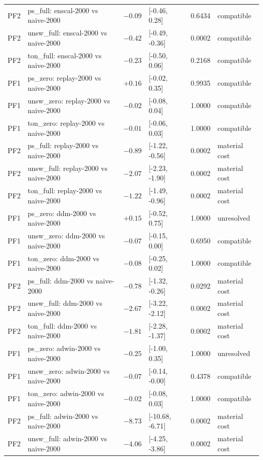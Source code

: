 \begin{table}[t]
\begin{tabular}{l l r l r l}
PF2 & ps\_full: enscal-2000 vs naive-2000 & $-0.09$ & [-0.46, 0.28] & 0.6434 & compatible \\
PF2 & unsw\_full: enscal-2000 vs naive-2000 & $-0.42$ & [-0.49, -0.36] & 0.0002 & compatible \\
PF2 & ton\_full: enscal-2000 vs naive-2000 & $-0.23$ & [-0.50, 0.06] & 0.2168 & compatible \\
PF1 & ps\_zero: replay-2000 vs naive-2000 & $+0.16$ & [-0.02, 0.35] & 0.9935 & compatible \\
PF1 & unsw\_zero: replay-2000 vs naive-2000 & $-0.02$ & [-0.08, 0.04] & 1.0000 & compatible \\
PF1 & ton\_zero: replay-2000 vs naive-2000 & $-0.01$ & [-0.06, 0.03] & 1.0000 & compatible \\
PF2 & ps\_full: replay-2000 vs naive-2000 & $-0.89$ & [-1.22, -0.56] & 0.0002 & material cost \\
PF2 & unsw\_full: replay-2000 vs naive-2000 & $-2.07$ & [-2.23, -1.90] & 0.0002 & material cost \\
PF2 & ton\_full: replay-2000 vs naive-2000 & $-1.22$ & [-1.49, -0.96] & 0.0002 & material cost \\
PF1 & ps\_zero: ddm-2000 vs naive-2000 & $+0.15$ & [-0.52, 0.75] & 1.0000 & unresolved \\
PF1 & unsw\_zero: ddm-2000 vs naive-2000 & $-0.07$ & [-0.15, 0.00] & 0.6950 & compatible \\
PF1 & ton\_zero: ddm-2000 vs naive-2000 & $-0.08$ & [-0.25, 0.02] & 1.0000 & compatible \\
PF2 & ps\_full: ddm-2000 vs naive-2000 & $-0.78$ & [-1.32, -0.26] & 0.0292 & material cost \\
PF2 & unsw\_full: ddm-2000 vs naive-2000 & $-2.67$ & [-3.22, -2.12] & 0.0002 & material cost \\
PF2 & ton\_full: ddm-2000 vs naive-2000 & $-1.81$ & [-2.28, -1.37] & 0.0002 & material cost \\
PF1 & ps\_zero: adwin-2000 vs naive-2000 & $-0.25$ & [-1.00, 0.35] & 1.0000 & unresolved \\
PF1 & unsw\_zero: adwin-2000 vs naive-2000 & $-0.07$ & [-0.14, -0.00] & 0.4378 & compatible \\
PF1 & ton\_zero: adwin-2000 vs naive-2000 & $-0.02$ & [-0.08, 0.03] & 1.0000 & compatible \\
PF2 & ps\_full: adwin-2000 vs naive-2000 & $-8.73$ & [-10.68, -6.71] & 0.0002 & material cost \\
PF2 & unsw\_full: adwin-2000 vs naive-2000 & $-4.06$ & [-4.25, -3.86] & 0.0002 & material cost \\

\end{tabular}
\end{table}
